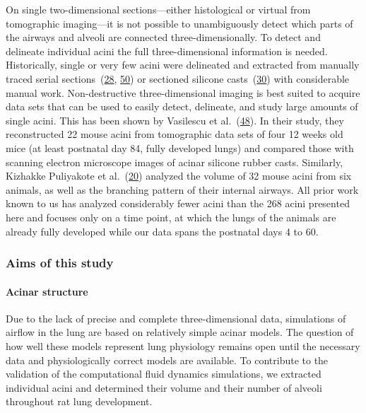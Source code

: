 \documentclass[
  american,
]{article}
\begin{document}
On single two-dimensional sections---either histological or virtual from tomographic imaging---it is not possible to unambiguously detect which parts of the airways and alveoli are connected three-dimensionally.
To detect and delineate individual acini the full three-dimensional information is needed.
Historically, single or very few acini were delineated and extracted from manually traced serial sections~(\protect\hyperlink{ref-c3aIB7f9}{28}, \protect\hyperlink{ref-CPhMy3Ie}{50}) or sectioned silicone casts~(\protect\hyperlink{ref-1GJECnKBu}{30}) with considerable manual work.
Non-destructive three-dimensional imaging is best suited to acquire data sets that can be used to easily detect, delineate, and study large amounts of single acini.
This has been shown by Vasilescu et al.~(\protect\hyperlink{ref-C6OaY84D}{48}).
In their study, they reconstructed 22 mouse acini from tomographic data sets of four 12 weeks old mice (at least postnatal day 84, fully developed lungs) and compared those with scanning electron microscope images of acinar silicone rubber casts.
Similarly, Kizhakke Puliyakote et al.~(\protect\hyperlink{ref-RGBeCf8v}{20}) analyzed the volume of 32 mouse acini from six animals, as well as the branching pattern of their internal airways.
All prior work known to us has analyzed considerably fewer acini than the 268 acini presented here and focuses only on a time point, at which the lungs of the animals are already fully developed while our data spans the postnatal days 4 to 60.

\hypertarget{aims-of-this-study}{%
\subsubsection{Aims of this study}\label{aims-of-this-study}}

\hypertarget{acinar-structure}{%
\paragraph{Acinar structure}\label{acinar-structure}}

Due to the lack of precise and complete three-dimensional data, simulations of airflow in the lung are based on relatively simple acinar models.
The question of how well these models represent lung physiology remains open until the necessary data and physiologically correct models are available.
To contribute to the validation of the computational fluid dynamics simulations, we extracted individual acini and determined their volume and their number of alveoli throughout rat lung development.
\end{document}
